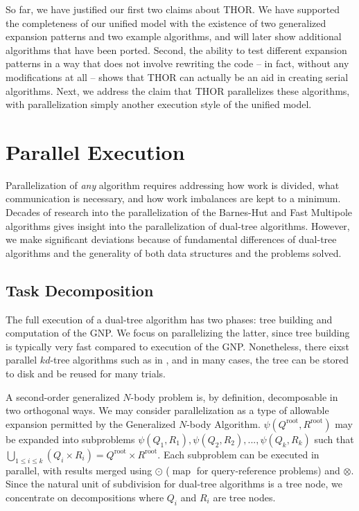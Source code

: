 \documentclass[twoside,leqno,twocolumn]{article}
\newcommand{\Union}{\bigcup}
\DeclareMathOperator*{\map}{map}
\newcommand{\gnp}{\psi}
\newcommand{\kdroot}[1]{#1^{\text{root}}}
\begin{document}
So far, we have justified our first two claims about THOR.
We have supported the completeness of our unified model with the existence of two generalized expansion patterns and two example algorithms, and will later show additional algorithms that have been ported.
Second, the ability to test different expansion patterns in a way that does not involve rewriting the code -- in fact, without any modifications at all -- shows that THOR can actually be an aid in creating serial algorithms.
Next, we address the claim that THOR parallelizes these algorithms, with parallelization simply another execution style of the unified model.

\section{Parallel Execution}

Parallelization of {\em any} algorithm requires addressing how work is divided, what communication is necessary, and how work imbalances are kept to a minimum.
Decades of research into the parallelization of the Barnes-Hut and Fast Multipole algorithms gives insight into the parallelization of dual-tree algorithms.
However, we make significant deviations because of fundamental differences of dual-tree algorithms and the generality of both data structures and the problems solved.

\subsection{Task Decomposition}

The full execution of a dual-tree algorithm has two phases: tree building and computation of the GNP.
We focus on parallelizing the latter, since tree building is typically very fast compared to execution of the GNP.
Nonetheless, there eixst parallel $kd$-tree algorithms such as in \cite{alfuraih00parallel}, and in many cases, the tree can be stored to disk and be reused for many trials.

A second-order generalized $N$-body problem is, by definition, decomposable in two orthogonal ways.
We may consider parallelization as a type of allowable expansion permitted by the Generalized $N$-body Algorithm.
$\gnp(\kdroot{Q}, \kdroot{R})$ may be expanded into subproblems $\gnp(Q_1,R_1), \gnp(Q_2,R_2), ..., \gnp(Q_k, R_k)$ such that $\Union_{1 \leq i \leq k} (Q_i \times R_i) = \kdroot{Q} \times \kdroot{R}$.
Each subproblem can be executed in parallel, with results merged using $\odot$ ($\map$ for query-reference problems) and $\otimes$.
Since the natural unit of subdivision for dual-tree algorithms is a tree node, we concentrate on decompositions where $Q_i$ and $R_i$ are tree nodes.
\end{document}
